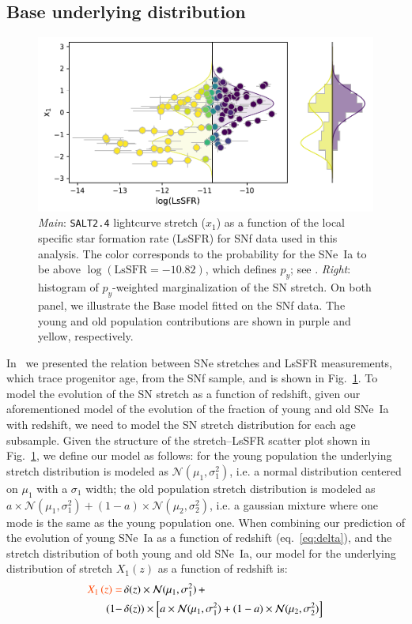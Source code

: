 \documentclass[]{aa} %
\newcommand{\nn}[1]{{\textcolor[rgb]{1, 0.27, 0}{#1}}}
\begin{document}
\subsection{\nn{Base underlying distribution}}
\label{sec:basemodel}

\begin{figure}
    \centering
    \includegraphics[width=0.8\linewidth]{Article_figures/model_base_hist.pdf}
    \caption{\textit{Main}: \textsc{\texttt{SALT2.4}} lightcurve stretch ($x_1$) as a function of
        the local specific star formation rate (LsSFR) for SNf data used in this
        analysis. The color corresponds to the probability for the SNe~Ia to be
        above $\log(\mathrm{LsSFR}=-10.82)$, which defines $p_y$; see
        \cite{rigault2018}. \textit{Right}: histogram of $p_y$-weighted
        marginalization of the SN stretch. On both panel, we illustrate the
        Base model fitted on the SNf data. The young and old population
        contributions are shown in purple and yellow, respectively.}
    \label{fig:stretchlssfr}
\end{figure}

\nn{In~\cite{rigault2018} we presented the relation between SNe stretches and
LsSFR measurements, which trace progenitor age, from the SNf sample, and is
shown in Fig.~\ref{fig:stretchlssfr}}. To model the evolution of the SN stretch
as a function of redshift, given our aforementioned model of the evolution of
the fraction of young and old SNe~Ia with redshift, we need to model the SN
stretch distribution for each age subsample. Given the structure of the
stretch--LsSFR scatter plot shown in Fig.~\ref{fig:stretchlssfr}, we define our
model as follows: for the young population the underlying stretch distribution
is modeled as $\mathcal{N}(\mu_1, \sigma_1^2)$, i.e. a normal distribution
centered on $\mu_1$ with a $\sigma_1$ width; the old population stretch
distribution is modeled as $a\times \mathcal{N}(\mu_1, \sigma_1^2) + (1-a)\times
\mathcal{N}(\mu_2, \sigma_2^2)$, i.e. a gaussian mixture where one mode is the
same as the young population one. \nn{When combining our prediction of the
evolution of young SNe~Ia as a function of redshift (eq.~\ref{eq:delta}),
and the stretch distribution of both young and old SNe~Ia, our model for the
underlying distribution of stretch $X_1\left(z\right)$ as a function of
redshift is:}
\begin{align}
    \label{eq:stretchz}
    \nn{X_1\left(z \right) =
    } &\,\delta(z)\times\mathcal{N}(\mu_1,\sigma_1^2)\,+\nonumber\\
    (1-&\,\delta(z)) \times  \left[a\times\mathcal{N}(\mu_1,\sigma_1^2) +
    (1-a)\times\mathcal{N}(\mu_2,\sigma_2^2)\right]
\end{align}
\end{document}
